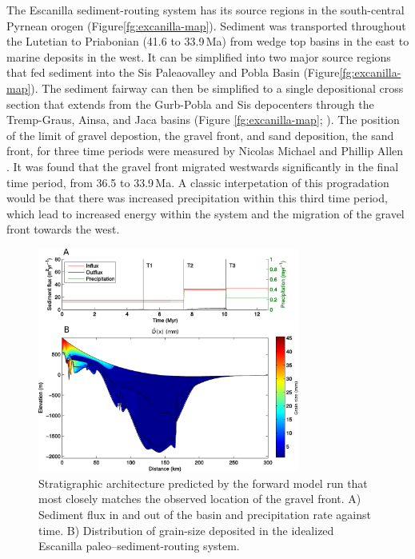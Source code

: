 The Escanilla sediment-routing system has its source regions in the south-central Pyrnean orogen (Figure\ref{fg:excanilla-map}). Sediment was transported throughout the Lutetian to Priabonian (41.6 to 33.9\,Ma) from wedge top basins in the east to marine deposits in the west. It can be simplified into two major source regions that fed sediment into the Sis Paleaovalley and Pobla Basin (Figure\ref{fg:excanilla-map}). The sediment fairway can then be simplified to a single depositional cross section that extends from the Gurb-Pobla and Sis depocenters through the Tremp-Graus, Ainsa, and Jaca basins (Figure \ref{fg:excanilla-map}; \citep{michael-etal-2013}). The position of the limit of gravel depostion, the gravel front, and sand deposition, the sand front, for three time periods were measured by Nicolas Michael and Phillip Allen \citep{michael-etal-2013}. It was found that the gravel front migrated westwards significantly in the final time period, from 36.5 to 33.9\,Ma. A classic interpetation of this progradation would be that there was increased precipitation within this third time period, which lead to increased energy within the system and the migration of the gravel front towards the west.

\begin{figure}
\centering
\includegraphics[width=8.6cm]{./figures/ch2-escanilla-model.pdf}
\caption{Stratigraphic architecture predicted by the forward model run that most closely matches the observed location of the gravel front. A) Sediment flux in and out of the basin and precipitation rate against time. B) Distribution of grain-size deposited in the idealized Escanilla paleo--sediment-routing system.}
\label{fg:escanilla-model}
\end{figure}

